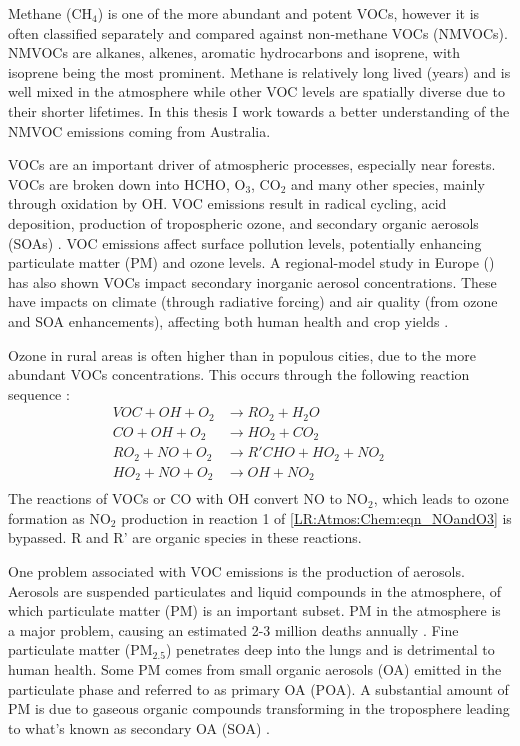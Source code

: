   Methane (CH$_4$) is one of the more abundant and potent VOCs, however it is often classified separately and compared against non-methane VOCs (NMVOCs).
  NMVOCs are alkanes, alkenes, aromatic hydrocarbons and isoprene, with isoprene being the most prominent.
  Methane is relatively long lived (years) and is well mixed in the atmosphere while other VOC levels are spatially diverse due to their shorter lifetimes.
  In this thesis I work towards a better understanding of the NMVOC emissions coming from Australia.

  VOCs are an important driver of atmospheric processes, especially near forests.
  VOCs are broken down into HCHO, O$_3$, CO$_2$ and many other species, mainly through oxidation by OH.
  VOC emissions result in radical cycling, acid deposition, production of tropospheric ozone, and secondary organic aerosols (SOAs) \citep{Atkinson2000, Kanakidou2005}.
  VOC emissions affect surface pollution levels, potentially enhancing particulate matter (PM) and ozone levels.
  A regional-model study in Europe (\cite{Aksoyoglu2017}) has also shown VOCs impact secondary inorganic aerosol concentrations.
  These have impacts on climate (through radiative forcing) and air quality (from ozone and SOA enhancements), affecting both human health and crop yields \citep{IPCC_Chapter2, Avnery2011, Lelieveld2015}.
  
  Ozone in rural areas is often higher than in populous cities, due to the more abundant VOCs concentrations.
  This occurs through the following reaction sequence \citep{Sillman1999}:
  \begin{equation}
    \begin{aligned}
      VOC + OH + O_2   & \to RO_2 + H_2O       && \\%
      CO + OH + O_2    & \to HO_2 + CO_2       && \\%
      RO_2 + NO + O_2  & \to R'CHO+HO_2+NO_2   && \\%
      HO_2 + NO + O_2  & \to OH + NO_2         && \\%
    \end{aligned}
    \label{LR:VOCs:eqn_VOCandNO}
  \end{equation}
  The reactions of VOCs or CO with OH convert NO to NO$_2$, which leads to ozone formation as NO$_2$ production in reaction 1 of \ref{LR:Atmos:Chem:eqn_NOandO3} is bypassed.
  R and R' are organic species in these reactions.
  
  One problem associated with VOC emissions is the production of aerosols.
  Aerosols are suspended particulates and liquid compounds in the atmosphere, of which particulate matter (PM) is an important subset.
  PM in the atmosphere is a major problem, causing an estimated 2-3 million deaths annually \citep{Hoek2013, Krewski2009, Silva2013, Lelieveld2015}. 
  Fine particulate matter (PM$_{2.5}$) penetrates deep into the lungs and is detrimental to human health.
  Some PM comes from small organic aerosols (OA) emitted in the particulate phase and referred to as primary OA (POA).
  A substantial amount of PM is due to gaseous organic compounds transforming in the troposphere leading to what's known as secondary OA (SOA) \citep{Kroll2008}.
  
